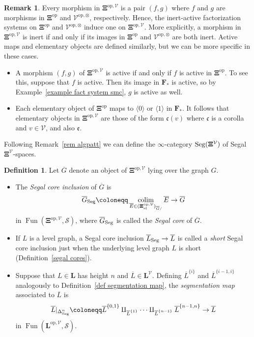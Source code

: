 \documentclass{amsart}
\numberwithin{theorem}{subsection}
\theoremstyle{definition}
\newtheorem{definition}[theorem]{Definition}
\newtheorem{remark}[theorem]{Remark}
\providecommand{\op}{\mathrm{op}}
\providecommand{\xel}{\mathrm{el}}
\newcommand{\xFun}{\operatorname{Fun}}
\DeclareMathOperator*{\colim}{colim}
\newcommand{\finsetskel}{\mathbf{F}}
\newcommand{\pfinsetskel}{\finsetskel_*}
\newcommand{\xS}{\mathcal{S}}
\newcommand{\xV}{\mathcal{V}}
\newcommand{\xfe}{\mathfrak{e}}
\newcommand{\xfc}{\mathfrak{c}}
\newcommand{\name}[1]{\ensuremath{\text{\textup{#1}}}}
\newcommand{\levelg}{\mathbf{L}}
\newcommand{\levelV}{\levelg^\xV}
\newcommand{\gc}{\mathbf{\Xi}}
\newcommand{\gcV}{\gc^{\xV}}
\newcommand{\opgcV}{\gc^{\op,\xV}}
\newcommand{\Seg}{\name{Seg}}
\begin{document}
\begin{remark}\label{rem gcalgpatt}
Every morphism in $\gc^{\op, \xV}$ is a pair $(f,g)$ where $f$ and $g$ are morphisms in $\gc^\op$ and $\xV^{\op,\otimes}$, respectively. 
Hence, the inert-active factorization systems on $\gc^\op$ and $\xV^{\op,\otimes}$ induce one on $\gc^{\op, \xV}$. 
More explicitly, a morphism in $\gc^{\op, \xV}$ is inert if and only if its images in $\gc^\op$ and $\xV^{\op,\otimes}$ are both inert. 
Active maps and elementary objects are defined similarly, but we can be more specific in these cases.
\begin{itemize}
\item 
A morphism $(f,g)$ of $\gc^{\op, \xV}$ is active if and only if $f$ is active in $\gc^\op$.
To see this, suppose that $f$ is active. 
Then its image in $\pfinsetskel$ is active, so by Example~\ref{example fact system smc}, $g$ is active as well. 
\item
Each elementary object of $\gc^\op$ maps to $\langle 0\rangle$ or $\langle 1 \rangle$ in $\pfinsetskel$.
It follows that elementary objects in $\gc^{\op, \xV}$ are those of the form $\xfc(v)$ where $\xfc$ is a corolla and $v\in \xV$, and also $\xfe$.
\end{itemize}
Following Remark~\ref{rem algpatt} we can define the $\infty$-category $\Seg(\gcV)$ of Segal $\gcV$-spaces. 
\end{remark}

\begin{definition}\label{def bar Segal cores}
Let  $\overline G$ denote an object of ${\opgcV}$ lying over the graph $G$.
\begin{itemize}
\item The \emph{Segal core inclusion} of $\overline G$ is 
\[
	\overline G_{\Seg} \coloneqq \colim_{\overline E\in (\opgcV_{\xel})_{\overline G/}} \overline E\to \overline G
\]
in $\xFun(\opgcV,\xS)$,
where $\overline G_{\Seg}$ is called the \emph{Segal core} of $\overline G$.
\item If $L$ is a level graph, a Segal core inclusion $\overline L_{\Seg} \to \overline L$ is called a \emph{short} Segal core inclusion just when the underlying level graph $L$ is short (Definition~\ref{segal cores}).
\item Suppose that $L \in \levelg$ has height $n$ and $\overline L \in \levelV$.
Defining $\overline L^{\{i\}}$ and $\overline L^{\{i-1,i\}}$ analogously to Definition~\ref{def segmentation map}, the \emph{segmentation map} associated to $\overline L$ is
\[
\overline L|_{\Delta^n_{\Seg}} \coloneqq \overline L^{\{0,1\}} \amalg_{\overline L^{\{1\}}}  \cdots
\amalg_{\overline L^{\{n-1\}}} \overline L^{\{n-1,n\}} \to \overline L
\]
in $\xFun(\levelg^{\op,\xV},\xS)$.
\end{itemize}
\end{definition}
\end{document}
